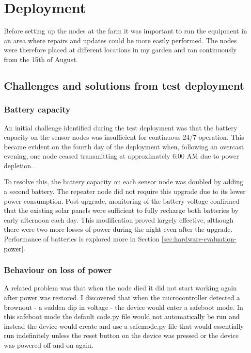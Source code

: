 \section{Deployment}\label{sec:deployment}

Before setting up the nodes at the farm it was important to run the equipment in
an area where repairs and updates could be more easily performed. The nodes were
therefore placed at different locations in my garden and ran continuously from
the 15th of August.

\subsection{Challenges and solutions from test deployment}

\subsubsection{Battery capacity}

An initial challenge identified during the test deployment was that the battery
capacity on the sensor nodes was insufficient for continuous 24/7 operation.
This became evident on the fourth day of the deployment when, following an
overcast evening, one node ceased transmitting at approximately 6:00 AM due to
power depletion.

To resolve this, the battery capacity on each sensor node was doubled by adding
a second battery. The repeater node did not require this upgrade due to its
lower power consumption. Post-upgrade, monitoring of the battery voltage
confirmed that the existing solar panels were sufficient to fully recharge both
batteries by early afternoon each day. This modification proved largely
effective, although there were two more losses of power during the night even
after the upgrade. Performance of batteries is explored more in Section
\ref{sec:hardware-evaluation-power}.

\subsubsection {Behaviour on loss of power}

A related problem was that when the node died it did not start working again
after power was restored. I discovered that when the microcontroller detected a
brownout - a sudden dip in voltage - the device would enter a safeboot mode. In
this safeboot mode the default code.py file would not automatically be run and
instead the device would create and use a safemode.py file that would
essentially run indefinitely unless the reset button on the device was pressed
or the device was powered off and on again.

